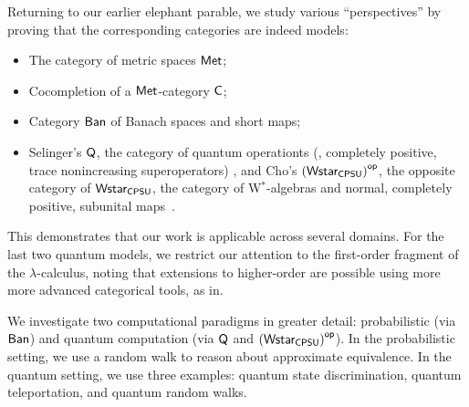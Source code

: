 Returning to our earlier elephant parable, we study various “perspectives” by proving that the corresponding categories are indeed models:
\begin{itemize}
    \item The category of metric spaces $\mathsf{Met}$;
    \item Cocompletion of a $\mathsf{Met}$-category $\mathsf{C}$;
    \item Category $ \mathsf{Ban} $ of Banach spaces and short maps;
    \item  Selinger’s \( \mathsf{Q} \), the category of quantum operationts (\ie, completely positive, trace nonincreasing superoperators) \cite{selinger2004towards}, and Cho’s \( \left(\mathsf{Wstar_{CPSU}}\right)^{\mathsf{op}} \), the opposite category of \( \mathsf{Wstar_{CPSU}} \), the category of W$^*$-algebras and normal, completely positive, subunital maps~\cite{choSemanticsQuantumProgramming2016}.
\end{itemize}
This demonstrates that our work is applicable across several domains. For the last two quantum models, we restrict our attention to the first-order fragment of the $\lambda$-calculus, noting that extensions to higher-order are possible using more  more advanced categorical tools, as  in\cite{dahlqvist2023syntactic}.

We investigate two computational paradigms in greater detail: probabilistic (via $\mathsf{Ban}$) and quantum computation (via $\mathsf{Q}$ and $\left(\mathsf{Wstar_{CPSU}}\right)^{\mathsf{op}}$). In the probabilistic setting, we use a random walk to reason about approximate equivalence. In the quantum setting, we use three examples: quantum state discrimination, quantum teleportation, and quantum random walks.
 



